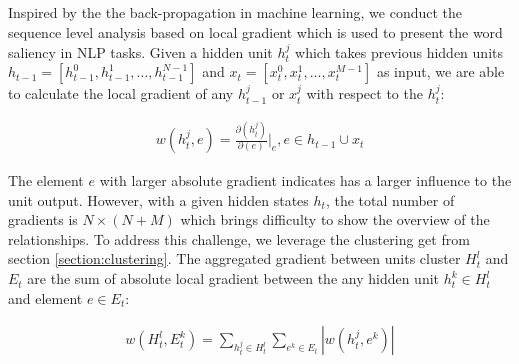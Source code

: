 
\subsection{}

Inspired by the the back-propagation in machine learning, we conduct the sequence level analysis based on local gradient which is used to present the word saliency in NLP tasks\cite{li2015visualizing}. Given a hidden unit $h^j_t$ which takes previous hidden units $h_{t-1} = [h^0_{t-1},h^1_{t-1},...,h^{N-1}_{t-1}]$ and $x_t = [x^0_t, x^1_t,...,x^{M-1}_t]$ as input, we are able to calculate the local gradient of any $h^j_{t-1}$ or $x^j_t$  with respect to the $h^j_t$:

\begin{equation}
    \label{equation:gradient}
    \begin{multlined}
    w(h^j_t, e) = \frac{\partial(h^j_t)}{\partial(e)}|_e, e \in h_{t-1} \cup x_t
    \end{multlined}
\end{equation}

The element $e$ with larger absolute gradient indicates has a larger influence to the unit output. However, with a given hidden states $h_t$, the total number of gradients is $N \times(N+M)$ which brings difficulty to show the overview of the relationships. To address this challenge, we leverage the clustering get from section \ref{section:clustering}. The aggregated gradient between units cluster $H_t^l$ and $E_t$ are the sum of absolute local gradient between the any hidden unit $h_t^k \in H_t^l$ and element $e \in E_t$:

\begin{equation}
    \label{equation:gradient}
    \begin{multlined}
    w(H_t^l, E^k_t) =\displaystyle\sum_{h^j_t \in H_t^l}\displaystyle\sum_{e^k \in E_t}|w(h^j_t, e^k)|
 \end{multlined}
\end{equation}
